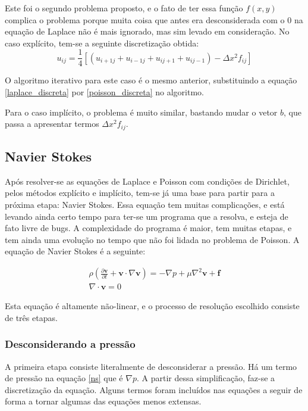 \documentclass[journal]{IEEEtran}
\begin{document}
Este foi o segundo problema proposto, e o fato de ter essa função $f(x,y)$ complica o problema porque muita coisa que antes era desconsiderada com o $0$ na equação de Laplace não é mais ignorado, mas sim levado em consideração. No caso explícito, tem-se a seguinte discretização obtida:
\begin{equation}
u_{ij}=\frac{1}{4}[(u_{i+1j}+u_{i-1j}+u_{ij+1}+u_{ij-1})-\Delta x^2 f_{ij}] \label{poisson_discreta}
\end{equation}

O algoritmo iterativo para este caso é o mesmo anterior, substituindo a equação \ref{laplace_discreta} por \ref{poisson_discreta} no algoritmo.

Para o caso implícito, o problema é muito similar, bastando mudar o vetor $b$, que passa a apresentar termos $\Delta x^2 f_{ij}$.
\subsection{Navier Stokes}

Após resolver-se as equações de Laplace e Poisson com condições de Dirichlet, pelos métodos explícito e implícito, tem-se já uma base para partir para a próxima etapa: Navier Stokes. Essa equação tem muitas complicações, e está levando ainda certo tempo para ter-se um programa que a resolva, e esteja de fato livre de bugs. A complexidade do programa é maior, tem muitas etapas, e tem ainda uma evolução no tempo que não foi lidada no problema de Poisson. A equação de Navier Stokes é a seguinte:

\begin{eqnarray}
\rho\left( \frac{\partial \textbf{v}}{\partial
t}+\textbf{v}\cdot\nabla\textbf{v}\right)=-\nabla
p+\mu\nabla^2\textbf{v}+\textbf{f} \label{ns}\\
 \nabla\cdot \textbf{v}=0 \nonumber
\end{eqnarray}

Esta equação é altamente não-linear, e o processo de resolução escolhido consiste de três etapas.
\subsubsection{Desconsiderando a pressão}
A primeira etapa consiste literalmente de desconsiderar a pressão. Há um termo de pressão na equação \ref{ns} que é $\nabla p$. A partir dessa simplificação, faz-se a discretização da equação. Alguns termos foram incluídos nas equações a seguir de forma a tornar algumas das equações menos extensas.
\end{document}
